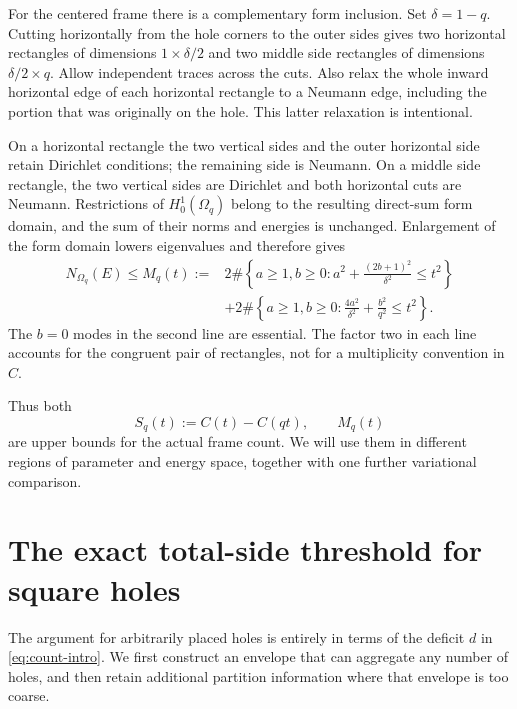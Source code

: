 \documentclass[11pt,reqno]{amsart}
\numberwithin{equation}{section}
\newcommand{\Om}{\Omega}
\begin{document}
For the centered frame there is a complementary form inclusion.
Set $\delta=1-q$. Cutting horizontally from the hole corners to
the outer sides gives two horizontal rectangles of dimensions
$1\times\delta/2$ and two middle side rectangles of dimensions
$\delta/2\times q$. Allow independent traces across the cuts.
Also relax the whole inward horizontal edge of each horizontal
rectangle to a Neumann edge, including the portion that was
originally on the hole. This latter relaxation is intentional.

On a horizontal rectangle the two vertical sides and the outer
horizontal side retain Dirichlet conditions; the remaining side
is Neumann. On a middle side rectangle, the two vertical sides
are Dirichlet and both horizontal cuts are Neumann. Restrictions
of $H^1_0(\Om_q)$ belong to the resulting direct-sum form domain,
and the sum of their norms and energies is unchanged. Enlargement
of the form domain lowers eigenvalues and therefore gives
\begin{equation}\label{eq:mixed-count}
\begin{split}
 N_{\Om_q}(E)\le M_q(t):={}&
 2\#\left\{a\ge1,b\ge0:
 a^2+\frac{(2b+1)^2}{\delta^2}\le t^2\right\}\\
 &+2\#\left\{a\ge1,b\ge0:
 \frac{4a^2}{\delta^2}+\frac{b^2}{q^2}\le t^2\right\}.
\end{split}
\end{equation}
The $b=0$ modes in the second line are essential. The factor two
in each line accounts for the congruent pair of rectangles, not
for a multiplicity convention in $C$.

Thus both
\begin{equation}\label{eq:two-counts}
 S_q(t):=C(t)-C(qt),\qquad M_q(t)
\end{equation}
are upper bounds for the actual frame count. We will use them in
different regions of parameter and energy space, together with
one further variational comparison.

\section{The exact total-side threshold for square holes}\label{sec:holes}

The argument for arbitrarily placed holes is entirely in terms
of the deficit $d$ in \eqref{eq:count-intro}. We first construct
an envelope that can aggregate any number of holes, and then
retain additional partition information where that envelope is
too coarse.
\end{document}
